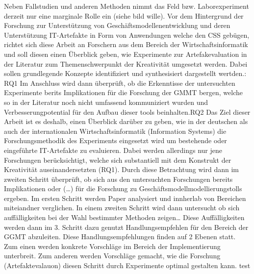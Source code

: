 Neben Fallstudien und anderen Methoden nimmt das Feld bzw. Laborexperiment derzeit nur eine marginale Rolle ein (siehe bild wille).
Vor dem Hintergrund der Forschung zur Unterstützung von Geschäftsmodellenentwicklung und deren Unterstützung IT-Artefakte in Form von Anwendungen welche den CSS gebügen, richtet sich diese Arbeit an Forschern aus dem Bereich der Wirtschaftsinformatik und soll diesen einen Überblick geben, wie Experimente zur Artefakevaluation in der Literatur zum Themenschwerpunkt der Kreativität umgesetzt werden. Dabei sollen grundlegende Konzepte identifiziert und synthesisiert dargestellt wertden.: RQ1 Im Anschluss wird dann überprüft, ob die Erkenntisse der untersuchten Experimente berits Implikationen für die Forschung der GMMT bergen, welche so in der Literatur noch nicht umfassend kommuniziert wurden und Verbesserungpotential für den Aufbau dieser tools beinhalten.RQ2
Das Ziel dieser Arbeit ist es deshalb, einen Überblick darüber zu geben, wie in der deutschen als auch der internationalen Wirtschaftsinformatik (Information Systems) die Forschungsmethodik des Experiments eingesetzt wird um bestehende oder eingeführte IT-Artefakte zu evaluieren. Dabei werden allerdings nur jene Forschungen berücksichtigt, welche sich substantiell mit dem Konstrukt der Kreativität auseinandersetzten (RQ1).  
Durch diese Betrachtung wird dann im zweiten Schritt überprüft, ob sich aus den untersuchten Forschungen bereits Implikationen oder (…) für die Forschung zu Geschäftsmodellmodellierungstolls ergeben.
Im ersten Schritt werden Paper analysiert und innherlab von Bereichen miteiandner verglichen. In einem zweiten Schritt wird dann untersucht ob sich auffälligkeiten bei der Wahl bestimmter Methoden zeigen… Diese Auffälligkeiten werden dann im 3. Schritt dazu genutzt Handlungsempfehlen für den Bereich der GGMT abzuleiten. Diese Handlungsempfehlungen finden auf 2 Ebenen statt. Zum einen werden konkrete Vorschläge im Bereich der Implementierung unterbreit. Zum anderen werden Vorschläge gemacht, wie die Forschung (Artefaktevalauon) diesen Schritt durch Experimente optimal gestalten kann. test

